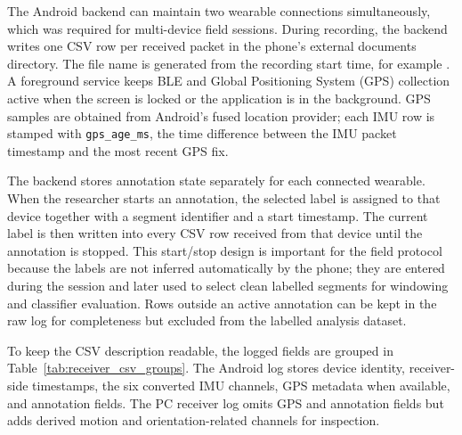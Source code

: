 The Android backend can maintain two wearable connections simultaneously, which was required for multi-device field sessions. During recording, the backend writes one CSV row per received packet in the phone's external documents directory. The file name is generated from the recording start time, for example . A foreground service keeps BLE and Global Positioning System (GPS) collection active when the screen is locked or the application is in the background. GPS samples are obtained from Android's fused location provider; each IMU row is stamped with \texttt{gps\_age\_ms}, the time difference between the IMU packet timestamp and the most recent GPS fix.

The backend stores annotation state separately for each connected wearable. When the researcher starts an annotation, the selected label is assigned to that device together with a segment identifier and a start timestamp. The current label is then written into every CSV row received from that device until the annotation is stopped. This start/stop design is important for the field protocol because the labels are not inferred automatically by the phone; they are entered during the session and later used to select clean labelled segments for windowing and classifier evaluation. Rows outside an active annotation can be kept in the raw log for completeness but excluded from the labelled analysis dataset.

To keep the CSV description readable, the logged fields are grouped in Table~\ref{tab:receiver_csv_groups}. The Android log stores device identity, receiver-side timestamps, the six converted IMU channels, GPS metadata when available, and annotation fields. The PC receiver log omits GPS and annotation fields but adds derived motion and orientation-related channels for inspection.

